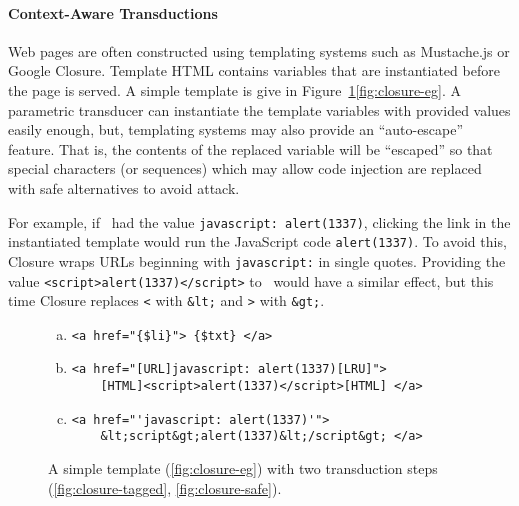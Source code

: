 
\paragraph{Context-Aware Transductions}

Web pages are often constructed using templating systems such as Mustache.js or Google Closure.
Template HTML contains variables that are instantiated before the page is served.
A simple template is give in Figure~\ref{fig:closure}\ref{fig:closure-eg}.
A parametric transducer can instantiate the template variables with provided values easily enough, but, templating systems may also provide an ``auto-escape'' feature.
That is, the contents of the replaced variable will be ``escaped'' so that special characters (or sequences) which may allow code injection are replaced with safe alternatives to avoid attack.

For example, if \linkvar\ had the value \texttt{javascript: alert(1337)}, clicking the link in the instantiated template would run the JavaScript code \texttt{alert(1337)}.
To avoid this, Closure wraps URLs beginning with \texttt{javascript:} in single quotes.
Providing the value \texttt{<script>alert(1337)</script>} to \linktextvar\ would have a similar effect, but this time Closure replaces \texttt{<} with \texttt{\&lt;} and \texttt{>} with \texttt{\&gt;}.

\begin{figure}
\begin{center}
\begin{minipage}{.75\linewidth}
\begin{enumerate}[(a)]
\item \label{fig:closure-eg}
\begin{verbatim}
<a href="{$li}"> {$txt} </a>
\end{verbatim}
\item \label{fig:closure-tagged}
\begin{verbatim}
<a href="[URL]javascript: alert(1337)[LRU]">
    [HTML]<script>alert(1337)</script>[HTML] </a>
\end{verbatim}
\item \label{fig:closure-safe}
\begin{verbatim}
<a href="'javascript: alert(1337)'">
    &lt;script&gt;alert(1337)&lt;/script&gt; </a>
\end{verbatim}
\end{enumerate}
\end{minipage}
\end{center}
\vspace{-3ex}
\caption{\label{fig:closure}A simple template (\ref{fig:closure-eg}) with two transduction steps (\ref{fig:closure-tagged}, \ref{fig:closure-safe}).}
\end{figure}

